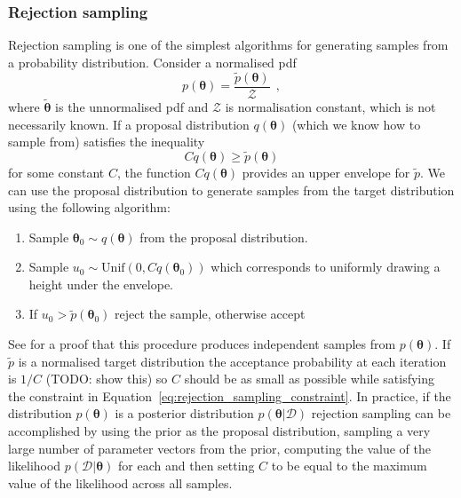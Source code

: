 \documentclass[12pt,dvipsnames]{report}
\renewcommand{\vec}[1]{\boldsymbol{\mathbf{#1}}}
\newcommand{\hquad}{~~}
\begin{document}
\subsubsection{Rejection sampling}
Rejection sampling is one of the simplest algorithms for generating samples
from a probability distribution. Consider a normalised pdf
\begin{equation}
    p(\vec{\theta})=\frac{\tilde{p}(\vec{\theta})}{\mathcal{Z}}
    \hquad,
\end{equation}
where $\tilde{\vec{\theta}}$ is the unnormalised pdf and $\mathcal{Z}$ is normalisation
constant, which is not necessarily known.
If a proposal distribution $q(\vec{\theta})$ (which we know how to sample from)
satisfies the inequality
\begin{equation}
    Cq(\vec{\theta})\geq \tilde{p}(\vec{\theta})
    \label{eq:rejection_sampling_constraint}
\end{equation}
for some constant $C$, the function $Cq(\vec{\theta})$ provides an upper envelope for
$\tilde{p}$. We can use the proposal distribution to generate samples from the target
distribution using the following algorithm:
\begin{enumerate}
    \item Sample $\vec{\theta}_0\sim q(\vec{\theta})$ from the proposal distribution.
    \item Sample $u_0\sim \mathrm{Unif}(0, Cq(\vec{\theta}_0))$ which corresponds to
          uniformly drawing a height under the envelope.
    \item If $u_0>\tilde{p}(\vec{\theta}_0)$ reject the sample, otherwise accept
\end{enumerate}
See \citet{murphy_book_2023} for a proof that this procedure produces independent samples 
from $p(\vec \theta)$.
If $\tilde{p}$ is a normalised target distribution the acceptance probability at
each iteration is  $1/C$ (TODO: show this) so  $C$ should be as small as possible
while satisfying the constraint in Equation~\ref{eq:rejection_sampling_constraint}.
In practice, if the distribution $p(\vec{\theta})$ is a posterior distribution
$p(\vec{\theta}\lvert \mathcal{D})$ rejection sampling can be accomplished by using
the prior as the proposal distribution, sampling a very large number of parameter
vectors from the prior, computing the value of the likelihood
$p(\mathcal{D} \lvert\vec{\theta})$ for each and then setting $C$ to be equal to the
maximum value of the likelihood across all samples.
\end{document}
